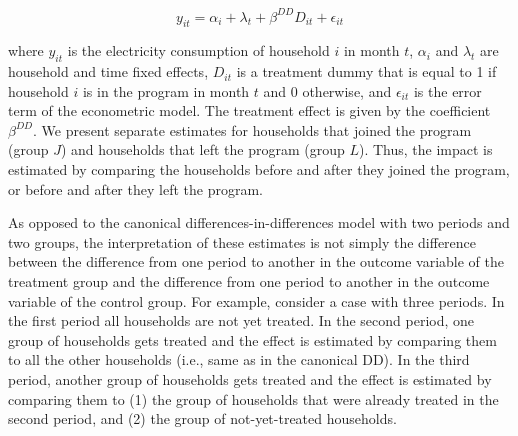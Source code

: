 \documentclass[12pt]{article}
\begin{document}
\begin{equation}
	y_{it} = \alpha_{i} + \lambda_{t} + \beta^{DD} D_{it} + \epsilon_{it}
\end{equation}

where $y_{it}$ is the electricity consumption of household $i$ in month $t$, $\alpha_{i}$ and $\lambda_{t}$ are household and time fixed effects, $D_{it}$ is a treatment dummy that is equal to 1 if household $i$ is in the program in month $t$ and 0 otherwise, and $\epsilon _{it}$ is the error term of the econometric model. The treatment effect is given by the coefficient $\beta^{DD}$. We present separate estimates for households that joined the program (group $J$) and households that left the program (group $L$). Thus, the impact is estimated by comparing the households before and after they joined the program, or before and after they left the program.

As opposed to the canonical differences-in-differences model with two periods and two groups, the interpretation of these estimates is not simply the difference between the difference from one period to another in the outcome variable of the treatment group and the difference from one period to another in the outcome variable of the control group. For example, consider a case with three periods. In the first period all households are not yet treated. In the second period, one group of households gets treated and the effect is estimated by comparing them to all the other households (i.e., same as in the canonical DD). In the third period, another group of households gets treated and the effect is estimated by comparing them to (1) the group of households that were already treated in the second period, and (2) the group of not-yet-treated households.
\end{document}
